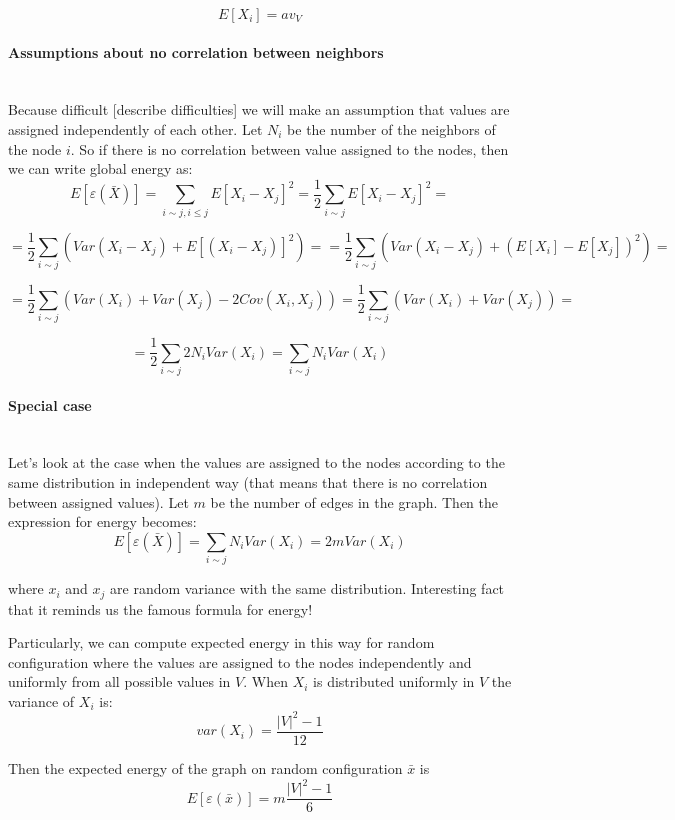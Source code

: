 \documentclass[12pt]{report}
\begin{document}
$$E[X_i] = av_V$$

\paragraph{Assumptions about no correlation between neighbors}
\mbox{} \\

Because difficult [describe difficulties] we will make an assumption that values are assigned independently of each other. Let $N_i$ be the number of the neighbors of the node $i$. So if there is no correlation between value assigned to the nodes, then we can write global energy as:
$$ E[\varepsilon (\bar{X})] =  \sum_{i \sim j, i \leq j} E[X_i - X_j]^2 = 
\frac{1}{2} \sum_{i \sim j} E[X_i - X_j]^2 = $$

$$ = \frac{1}{2} \sum_{i \sim j} \left(Var(X_i - X_j) + E[(X_i - X_j)]^2 \right)= 
= \frac{1}{2} \sum_{i \sim j} \left(Var(X_i - X_j) + (E[X_i] - E[X_j])^2 \right) = 
$$


$$ = \frac{1}{2} \sum_{i \sim j} \left(Var(X_i) + Var(X_j) - 2Cov(X_i, X_j) \right) = \frac{1}{2} \sum_{i \sim j} \left(Var(X_i) + Var(X_j) \right)=
$$

$$ = \frac{1}{2} \sum_{i \sim j} 2N_iVar(X_i) 
= \sum_{i \sim j} N_iVar(X_i)  
$$
\paragraph{Special case}
\mbox{} \\
Let's look at the case when the values are assigned to the nodes according to the same distribution in independent way (that means that there is no correlation between assigned values). Let $m$ be the number of edges in the graph. Then the expression for energy becomes:
$$ E[\varepsilon (\bar{X})] =  \sum_{i \sim j} N_iVar(X_i) = 2mVar(X_i)$$

where $x_i$ and $x_j$ are random variance with the same distribution.
Interesting fact that it reminds us the famous formula for energy!

Particularly, we can compute expected energy in this way for random configuration where the values are assigned to the nodes independently and uniformly from all possible values in $V$. 
When $X_i$ is distributed uniformly in $V$ the variance of $X_i$ is:
$$var(X_i) = \frac{|V|^2-1}{12}$$

Then the expected energy of the graph on random configuration $\bar{x}$ is
$$E[\varepsilon (\bar{x})] =  m\frac{|V|^2-1}{6}$$
\end{document}
